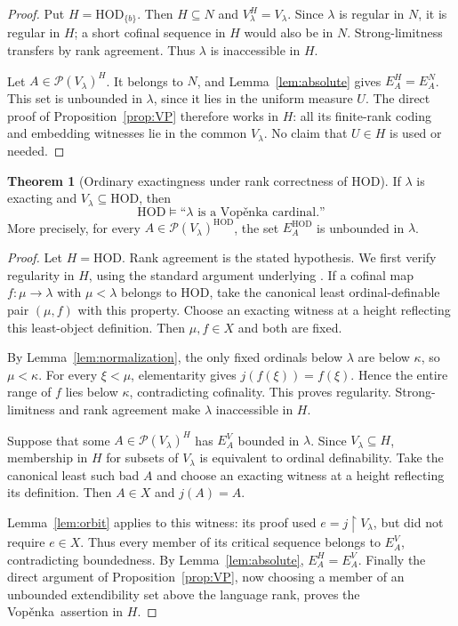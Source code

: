 \documentclass[11pt,letterpaper]{article}
\theoremstyle{definition}
\newtheorem{theorem}[definition]{Theorem}
\numberwithin{equation}{section}
\newcommand{\HOD}{\mathrm{HOD}}
\newcommand{\Pow}{\mathcal P}
\newcommand{\restr}{\mathbin{\upharpoonright}}
\newcommand{\Vop}{Vop\v{e}nka}
\begin{document}
\begin{proof}
Put $H=\HOD_{\{b\}}$. Then $H\subseteq N$ and $V_\lambda^H=V_\lambda$. Since $\lambda$ is regular in $N$, it is regular in $H$; a short cofinal sequence in $H$ would also be in $N$. Strong-limitness transfers by rank agreement. Thus $\lambda$ is inaccessible in $H$.

Let $A\in\Pow(V_\lambda)^H$. It belongs to $N$, and Lemma~\ref{lem:absolute} gives $E_A^H=E_A^N$. This set is unbounded in $\lambda$, since it lies in the uniform measure $U$. The direct proof of Proposition~\ref{prop:VP} therefore works in $H$: all its finite-rank coding and embedding witnesses lie in the common $V_\lambda$. No claim that $U\in H$ is used or needed.
\end{proof}

\begin{theorem}[Ordinary exactingness under rank correctness of HOD]\label{thm:ordinary}
If $\lambda$ is exacting and $V_\lambda\subseteq\HOD$, then
\[
 \HOD\models\text{``$\lambda$ is a \Vop\ cardinal.''}
\]
More precisely, for every $A\in\Pow(V_\lambda)^{\HOD}$, the set $E_A^{\HOD}$ is unbounded in $\lambda$.
\end{theorem}

\begin{proof}
Let $H=\HOD$. Rank agreement is the stated hypothesis. We first verify regularity in $H$, using the standard argument underlying \cite[Theorem~2.10]{abl}. If a cofinal map $f:\mu\to\lambda$ with $\mu<\lambda$ belongs to HOD, take the canonical least ordinal-definable pair $(\mu,f)$ with this property. Choose an exacting witness at a height reflecting this least-object definition. Then $\mu,f\in X$ and both are fixed.

By Lemma~\ref{lem:normalization}, the only fixed ordinals below $\lambda$ are below $\kappa$, so $\mu<\kappa$. For every $\xi<\mu$, elementarity gives $j(f(\xi))=f(\xi)$. Hence the entire range of $f$ lies below $\kappa$, contradicting cofinality. This proves regularity. Strong-limitness and rank agreement make $\lambda$ inaccessible in $H$.

Suppose that some $A\in\Pow(V_\lambda)^H$ has $E_A^V$ bounded in $\lambda$. Since $V_\lambda\subseteq H$, membership in $H$ for subsets of $V_\lambda$ is equivalent to ordinal definability. Take the canonical least such bad $A$ and choose an exacting witness at a height reflecting its definition. Then $A\in X$ and $j(A)=A$.

Lemma~\ref{lem:orbit} applies to this witness: its proof used $e=j\restr V_\lambda$, but did not require $e\in X$. Thus every member of its critical sequence belongs to $E_A^V$, contradicting boundedness. By Lemma~\ref{lem:absolute}, $E_A^H=E_A^V$. Finally the direct argument of Proposition~\ref{prop:VP}, now choosing a member of an unbounded extendibility set above the language rank, proves the \Vop\ assertion in $H$.
\end{proof}
\end{document}
